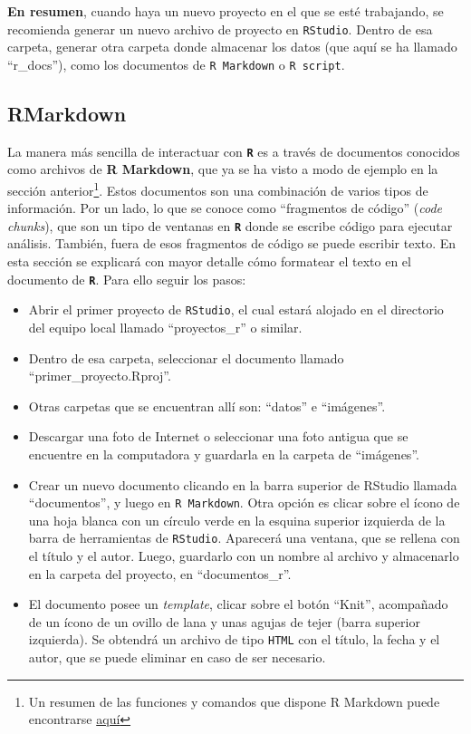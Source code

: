 \documentclass[
]{article}
\begin{document}
\textbf{En resumen}, cuando haya un nuevo proyecto en el que se esté trabajando, se recomienda generar un nuevo archivo de proyecto en \texttt{RStudio}. Dentro de esa carpeta, generar otra carpeta donde almacenar los datos (que aquí se ha llamado ``r\_docs''), como los documentos de \texttt{R\ Markdown} o \texttt{R\ script}.

\hypertarget{rmarkdown}{%
\subsection{RMarkdown}\label{rmarkdown}}

La manera más sencilla de interactuar con \textbf{\texttt{R}} es a través de documentos conocidos como archivos de \textbf{R Markdown}, que ya se ha visto a modo de ejemplo en la sección anterior\footnote{Un resumen de las funciones y comandos que dispone R Markdown puede encontrarse \href{https://www.rstudio.com/wp-content/uploads/2015/02/rmarkdown-cheatsheet.pdf}{aquí}}. Estos documentos son una combinación de varios tipos de información. Por un lado, lo que se conoce como ``fragmentos de código'' (\emph{code chunks}), que son un tipo de ventanas en \textbf{\texttt{R}} donde se escribe código para ejecutar análisis. También, fuera de esos fragmentos de código se puede escribir texto. En esta sección se explicará con mayor detalle cómo formatear el texto en el documento de \textbf{\texttt{R}}. Para ello seguir los pasos:

\begin{itemize}
\item
  Abrir el primer proyecto de \texttt{RStudio}, el cual estará alojado en el directorio del equipo local llamado ``proyectos\_r'' o similar.
\item
  Dentro de esa carpeta, seleccionar el documento llamado ``primer\_proyecto.Rproj''.
\item
  Otras carpetas que se encuentran allí son: ``datos'' e ``imágenes''.
\item
  Descargar una foto de Internet o seleccionar una foto antigua que se encuentre en la computadora y
  guardarla en la carpeta de ``imágenes''.
\item
  Crear un nuevo documento clicando en la barra superior de RStudio llamada ``documentos'', y luego en \texttt{R\ Markdown}. Otra opción es clicar sobre el ícono de una hoja blanca con un círculo verde en la esquina superior izquierda de la barra de herramientas de \texttt{RStudio}. Aparecerá una ventana, que se rellena con el título y el autor. Luego, guardarlo con un nombre al archivo y almacenarlo en la carpeta del proyecto, en ``documentos\_r''.
\item
  El documento posee un \emph{template}, clicar sobre el botón ``Knit'', acompañado de un ícono de un ovillo de lana y unas agujas de tejer (barra superior izquierda). Se obtendrá un archivo de tipo \texttt{HTML} con el título, la fecha y el autor, que se puede eliminar en caso de ser necesario.
\end{itemize}
\end{document}
